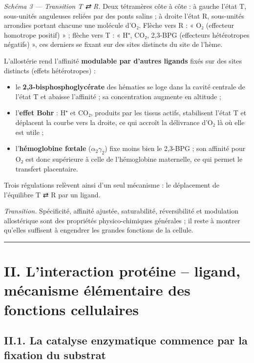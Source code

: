 \documentclass[11pt,a4paper]{article}
\providecommand{\tightlist}{\setlength{\itemsep}{0pt}\setlength{\parskip}{0pt}}
\begin{document}
\emph{Schéma 3 --- Transition T ⇄ R.} Deux tétramères côte à côte : à gauche l'état T, sous-unités anguleuses reliées par des ponts salins ; à droite l'état R, sous-unités arrondies portant chacune une molécule d'O₂. Flèche vers R : « O₂ (effecteur homotrope positif) » ; flèche vers T : « H⁺, CO₂, 2,3-BPG (effecteurs hétérotropes négatifs) », ces derniers se fixant sur des sites distincts du site de l'hème.

L'allostérie rend l'affinité \textbf{modulable par d'autres ligands} fixés sur des sites distincts (effets hétérotropes) :

\begin{itemize}
\tightlist
\item
  le \textbf{2,3-bisphosphoglycérate} des hématies se loge dans la cavité centrale de l'état T et abaisse l'affinité ; sa concentration augmente en altitude ;
\item
  l'\textbf{effet Bohr} : H⁺ et CO₂, produits par les tissus actifs, stabilisent l'état T et déplacent la courbe vers la droite, ce qui accroît la délivrance d'O₂ là où elle est utile ;
\item
  l'\textbf{hémoglobine fœtale} (\(\alpha_2\gamma_2\)) fixe moins bien le 2,3-BPG ; son affinité pour O₂ est donc supérieure à celle de l'hémoglobine maternelle, ce qui permet le transfert placentaire.
\end{itemize}

Trois régulations relèvent ainsi d'un seul mécanisme : le déplacement de l'équilibre T ⇄ R par un ligand.

\emph{Transition.} Spécificité, affinité ajustée, saturabilité, réversibilité et modulation allostérique sont des propriétés physico-chimiques générales ; il reste à montrer qu'elles suffisent à engendrer les grandes fonctions de la cellule.

\begin{center}\rule{0.5\linewidth}{0.5pt}\end{center}

\hypertarget{ii.-linteraction-protuxe9ine-ligand-muxe9canisme-uxe9luxe9mentaire-des-fonctions-cellulaires}{%
\section{II. L'interaction protéine -- ligand, mécanisme élémentaire des fonctions cellulaires}\label{ii.-linteraction-protuxe9ine-ligand-muxe9canisme-uxe9luxe9mentaire-des-fonctions-cellulaires}}

\hypertarget{ii.1.-la-catalyse-enzymatique-commence-par-la-fixation-du-substrat}{%
\subsection{II.1. La catalyse enzymatique commence par la fixation du substrat}\label{ii.1.-la-catalyse-enzymatique-commence-par-la-fixation-du-substrat}}
\end{document}
